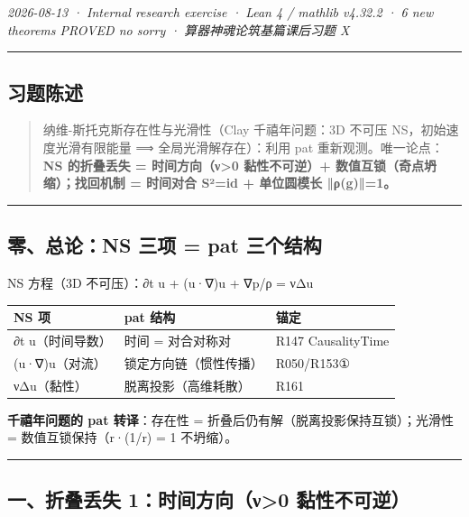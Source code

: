 \documentclass[
]{article}
\newcounter{none} %
\begin{document}
\emph{2026-08-13 · Internal research exercise · Lean 4 / mathlib v4.32.2
· 6 new theorems PROVED no sorry · 算器神魂论筑基篇课后习题 X }

\begin{center}\rule{0.5\linewidth}{0.5pt}\end{center}

\subsection{习题陈述}\label{ux4e60ux9898ux9648ux8ff0}

\begin{quote}
纳维-斯托克斯存在性与光滑性（Clay 千禧年问题：3D 不可压
NS，初始速度光滑有限能量 ⟹ 全局光滑解存在）：利用 pat
重新观测。唯一论点：\textbf{NS 的折叠丢失 = 时间方向（ν\textgreater0
黏性不可逆）+ 数值互锁（奇点坍缩）；找回机制 = 时间对合 S²=id +
单位圆模长 ‖ρ(g)‖=1。}
\end{quote}

\begin{center}\rule{0.5\linewidth}{0.5pt}\end{center}

\subsection{零、总论：NS 三项 = pat
三个结构}\label{ux96f6ux603bux8bbans-ux4e09ux9879-pat-ux4e09ux4e2aux7ed3ux6784}

NS 方程（3D 不可压）：∂t u + (u·∇)u + ∇p/ρ = νΔu

{\def\LTcaptype{none} %
\begin{longtable}[]{@{}lll@{}}
\toprule\noalign{}
NS 项 & pat 结构 & 锚定 \\
\midrule\noalign{}
\endhead
\bottomrule\noalign{}
\endlastfoot
∂t u（时间导数） & 时间 = 对合对称对 & R147 CausalityTime \\
(u·∇)u（对流） & 锁定方向链（惯性传播） & R050/R153① \\
νΔu（黏性） & 脱离投影（高维耗散） & R161 \\
\end{longtable}
}

\textbf{千禧年问题的 pat 转译}：存在性 =
折叠后仍有解（脱离投影保持互锁）；光滑性 = 数值互锁保持（r·(1/r) = 1
不坍缩）。

\begin{center}\rule{0.5\linewidth}{0.5pt}\end{center}

\subsection{一、折叠丢失 1：时间方向（ν\textgreater0
黏性不可逆）}\label{ux4e00ux6298ux53e0ux4e22ux5931-1ux65f6ux95f4ux65b9ux5411ux3bd0-ux9ecfux6027ux4e0dux53efux9006}
\end{document}
